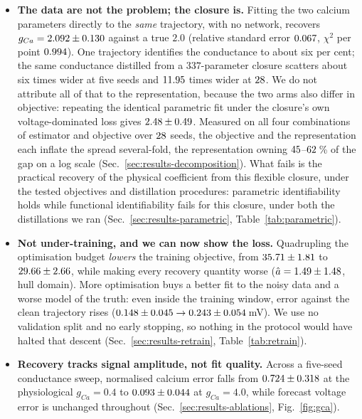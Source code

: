 \documentclass{article}
\newcommand{\NparamUde}{337}   %
\newcommand{\gcaMain}{2.0}     %
\newcommand{\gcaPhys}{0.4}     %
\newcommand{\gcaHi}{4.0}       %
\begin{document}
\begin{itemize}
  \item %
  \textbf{The data are not the problem; the closure is.} Fitting the two calcium
  parameters directly to the \emph{same} trajectory, with no network, recovers
  $g_{Ca} = 2.092 \pm 0.130$ against a true $\gcaMain$ (relative
  standard error $0.067$, $\chi^2$ per point
  $0.994$). One trajectory identifies the conductance to
  about six per cent; the same conductance distilled from a $\NparamUde$-parameter
  closure scatters about six times wider at five seeds and $11.95$ times
  wider at $28$. We do not attribute all of that to the representation,
  because the two arms also differ in objective: repeating the identical
  parametric fit under the closure's own voltage-dominated loss gives
  $2.48 \pm 0.49$. Measured on all four combinations of
  estimator and objective over $28$ seeds, the objective and the
  representation each inflate the spread several-fold, the representation owning
  $45$--$62$\,\% of the gap on a log scale
  (Sec.~\ref{sec:results-decomposition}). What
  fails is the practical recovery of the physical coefficient from this flexible
  closure, under the tested objectives and distillation procedures: parametric
  identifiability holds while functional identifiability fails for this closure,
  under both the distillations we ran
  (Sec.~\ref{sec:results-parametric}, Table~\ref{tab:parametric}).

  \item %
  \textbf{Not under-training, and we can now show the loss.} Quadrupling the
  optimisation budget \emph{lowers} the training objective, from
  $35.71 \pm 1.81$ to $29.66 \pm 2.66$, while making every
  recovery quantity worse ($\hat{a} = 1.49 \pm 1.48$, hull domain). More optimisation
  buys a better fit to the noisy data and a worse model of the truth: even inside
  the training window, error against the clean trajectory rises
  ($0.148 \pm 0.045 \to 0.243 \pm 0.054$\,mV). We use no
  validation split and no early stopping, so nothing in the protocol would have
  halted that descent
  (Sec.~\ref{sec:results-retrain}, Table~\ref{tab:retrain}).

  \item %
  \textbf{Recovery tracks signal amplitude, not fit quality.} Across a
  five-seed conductance sweep, normalised calcium error falls from
  $0.724 \pm 0.318$ at the physiological $g_{Ca}=\gcaPhys$ to
  $0.093 \pm 0.044$ at $g_{Ca}=\gcaHi$, while forecast voltage
  error is unchanged throughout
  (Sec.~\ref{sec:results-ablations}, Fig.~\ref{fig:gca}).
\end{itemize}
\end{document}
